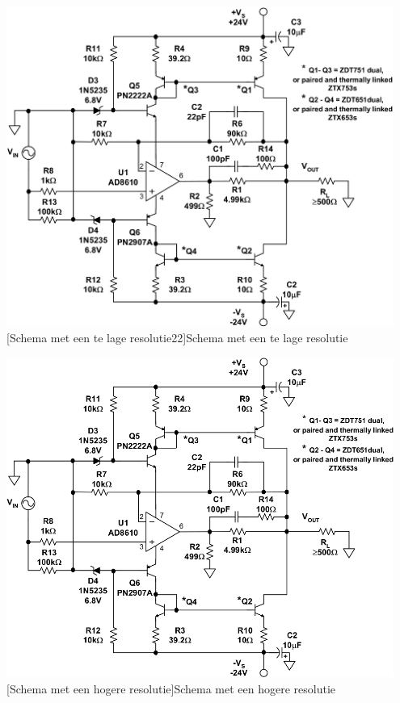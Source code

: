 \begin{center}
  \includegraphics[width=0.95\textwidth]{figures/chap2/schema.png}
  [Schema met een te lage resolutie22]{Schema met een te lage resolutie
  \label{fig_voorbeeld1}}
\end{center}

\begin{center}
  \includegraphics[width=0.95\textwidth]{figures/chap2/schema2.png}
  [Schema met een hogere resolutie]{Schema met een hogere resolutie
  \label{fig_voorbeeld2}}
\end{center}

